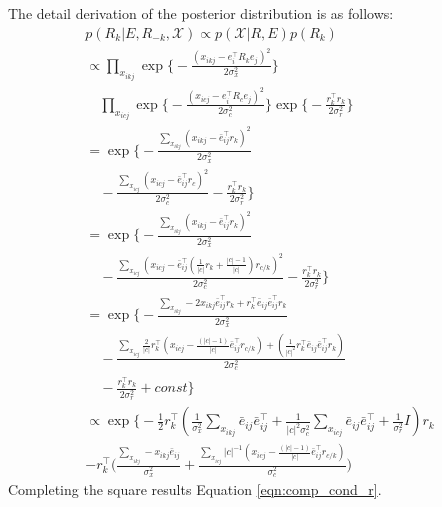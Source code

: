 The detail derivation of the posterior distribution is as follows:
\begin{align*}
&p(R_k | E, R_{-k}, \mathcal{X}) \propto p(\mathcal{X} | R, E)p(R_k)&\\
&\propto \prod_{x_{ikj}}\exp\bigg\{-\frac{(x_{ikj} - e_i^\top R_k e_j)^2}{2\sigma_x^2}\bigg\} &\\
& \quad\prod_{x_{icj}} \exp\bigg\{-\frac{(x_{icj} - e_i^\top R_c e_j)^2}{2\sigma_c^2}\bigg\} \exp\bigg\{-\frac{r_k^\top r_k}{2\sigma_r^2}\bigg\}&\\
&= \exp\bigg\{-\frac{\sum_{x_{ikj}}(x_{ikj} - \bar{e}_{ij}^\top r_k)^2}{2\sigma_x^2} &\\
&\quad- \frac{\sum_{x_{icj}}(x_{icj} - \bar{e}_{ij}^\top r_c)^2}{2\sigma_c^2} -\frac{r_k^\top r_k}{2\sigma_r^2} \bigg\}&\\
&= \exp\bigg\{-\frac{\sum_{x_{ikj}}(x_{ikj} - \bar{e}_{ij}^\top r_k)^2}{2\sigma_x^2} &\\ 
&\quad-\frac{\sum_{x_{icj}}(x_{icj} - \bar{e}_{ij}^\top (\frac{1}{|c|}r_k + \frac{|c|-1}{|c|})r_{c/k})^2}{2\sigma_c^2} -\frac{r_k^\top r_k}{2\sigma_r^2} \bigg\}&\\
&= \exp\bigg\{ -\frac{\sum_{x_{ikj}}- 2 x_{ikj} \bar{e}_{ij}^\top r_k + r_k^\top \bar{e}_{ij} \bar{e}_{ij}^\top r_k }{2\sigma_x^2} &\\
&\quad-\frac{\sum_{x_{icj}} \frac{2}{|c|} r_k ^\top (x_{icj} - \frac{(|c|-1)}{|c|} \bar{e}_{ij}^\top r_{c/k}) + (\frac{1}{|c|^2}r_k^\top \bar{e}_{ij} \bar{e}_{ij}^\top r_k)}{2\sigma_c^2} &\\
&\quad-\frac{r_k^\top r_k}{2\sigma_r^2} + const \bigg\}&\\
&\propto \exp\bigg\{ - \frac{1}{2}r_k^\top(\frac{1}{\sigma_x^2}\sum_{x_{ikj}} \bar{e}_{ij}\bar{e}_{ij}^\top + \frac{1}{|c|^2\sigma_c^2}\sum_{x_{icj}} \bar{e}_{ij}\bar{e}_{ij}^\top + \frac{1}{\sigma_r^2}I) r_k  &\\
&- r_k^\top \Big(\frac{\sum_{x_{ikj}}-x_{ikj}\bar{e}_{ij}}{\sigma_x^2} + \frac{\sum_{x_{icj}} |c|^{-1} (x_{icj} - \frac{(|c|-1)}{|c|} \bar{e}_{ij}^\top r_{c/k})}{\sigma_c^2} \Big)&
\end{align*}
Completing the square results Equation \ref{eqn:comp_cond_r}.


